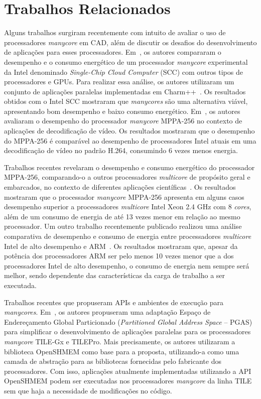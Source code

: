 \chapter{Trabalhos Relacionados}

Alguns trabalhos surgiram recentemente com intuito de avaliar o uso de processadores \emph{manycore} em CAD, além de discutir os desafios do desenvolvimento de aplicações para esses processadores.
Em~\cite{SCCEnergy:2012}, os autores compararam o desempenho e o consumo energético de um processador \emph{manycore} experimental da Intel denominado \emph{Single-Chip Cloud Computer} (SCC) com outros tipos de processadores e GPUs. Para realizar essa análise, os autores utilizaram um conjunto de aplicações paralelas implementadas em Charm++~\cite{Charm:2012}. Os resultados obtidos com o Intel SCC mostraram que \emph{manycores} são uma alternativa viável, apresentando bom desempenho e baixo consumo energético.
Em~\cite{MPPA-1:2013}, os autores avaliaram o desempenho do processador \emph{manycore} MPPA-256 no contexto de aplicações de decodificação de vídeo. Os resultados mostraram que o desempenho do MPPA-256 é comparável ao desempenho de processadores Intel atuais em uma decodificação de vídeo no padrão H.264, consumindo 6 vezes menos energia.

Trabalhos recentes revelaram o desempenho e consumo energético do processador MPPA-256, comparando-o a outros processadores \textit{multicore} de propósito geral e embarcados, no contexto de diferentes aplicações científicas~\cite{Castro-SBAC-PAD:2014,Castro-IA3:2013,Castro-IA3-JPDC:2014}. Os resultados mostraram que o processador \emph{manycore} MPPA-256 apresenta em alguns casos desempenho superior a processadores \emph{multicore} Intel Xeon 2.4 GHz com 8 \emph{cores}, além de um consumo de energia de até 13 vezes menor em relação ao mesmo processador. Um outro trabalho recentemente publicado realizou uma análise comparativa de desempenho e consumo de energia entre processadores \emph{multicore} Intel de alto desempenho e ARM~\cite{Castro-Padoin-IET:2015}. Os resultados mostraram que, apesar da potência dos processadores ARM ser pelo menos 10 vezes menor que a dos processadores Intel de alto desempenho, o consumo de energia nem sempre será melhor, sendo dependente das características da carga de trabalho a ser executada.

Trabalhos recentes que propuseram APIs e ambientes de execução para \emph{manycores}. Em~\cite{TSHMEM:2013}, os autores propuseram uma adaptação Espaço de Endereçamento Global Particionado (\emph{Partitioned Global Address Space} -- PGAS) para simplificar o desenvolvimento de aplicações paralelas para os processadores \emph{manycore} TILE-Gx e TILEPro. Mais precisamente, os autores utilizaram a biblioteca OpenSHMEM como base para a proposta, utilizando-a como uma camada de abstração para as bibliotecas fornecidas pelo fabricante dos processadores. Com isso, aplicações atualmente implementadas utilizando a API OpenSHMEM podem ser executadas nos processadores \emph{manycore} da linha TILE sem que haja a necessidade de modificações no código.
